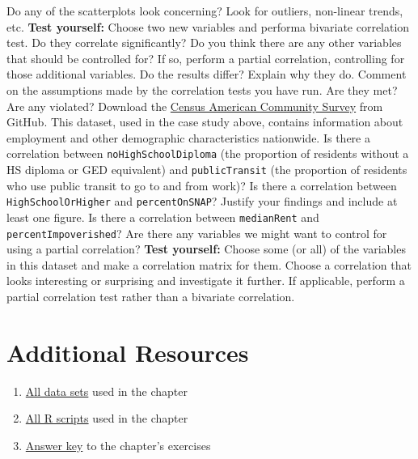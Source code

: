 Do any of the scatterplots look concerning? Look for outliers, non-linear trends, etc.
\prob \textbf{Test yourself:} Choose two new variables and performa bivariate correlation test. Do they correlate significantly? Do you think there are any other variables that should be controlled for? If so, perform a partial correlation, controlling for those additional variables. Do the results differ? Explain why they do. Comment on the assumptions made by the correlation tests you have run. Are they met? Are any violated?
\prob Download the \href{https://raw.githubusercontent.com/faulconbridge/appliedStats/master/LaTeX/part03/data/correlationCaseStudy.csv}{Census American Community Survey} from GitHub. This dataset, used in the case study above, contains information about employment and other demographic characteristics nationwide.
\prob Is there a correlation between \verb|noHighSchoolDiploma| (the proportion of residents without a HS diploma or GED equivalent) and \verb|publicTransit| (the proportion of residents who use public transit to go to and from work)?
\prob Is there a correlation between \verb|HighSchoolOrHigher| and \verb|percentOnSNAP|? Justify your findings and include at least one figure.
\prob Is there a correlation between \verb|medianRent| and \verb|percentImpoverished|? Are there any variables we might want to control for using a partial correlation?
\prob \textbf{Test yourself:} Choose some (or all) of the variables in this dataset and make a correlation matrix for them. Choose a correlation that looks interesting or surprising and investigate it further. If applicable, perform a partial correlation test rather than a bivariate correlation.

\section{Additional Resources}

\begin{enumerate}
\item \href{https://github.com/faulconbridge/appliedStats/tree/master/LaTeX/part03/data}{All data sets} used in the chapter
\item \href{https://github.com/faulconbridge/appliedStats/tree/master/LaTeX/part03/RScripts}{All R scripts} used in the chapter
\item \href{https://github.com/faulconbridge/appliedStats/blob/master/LaTeX/part03/answers/correlation.md}{Answer key} to the chapter's exercises
\end{enumerate}